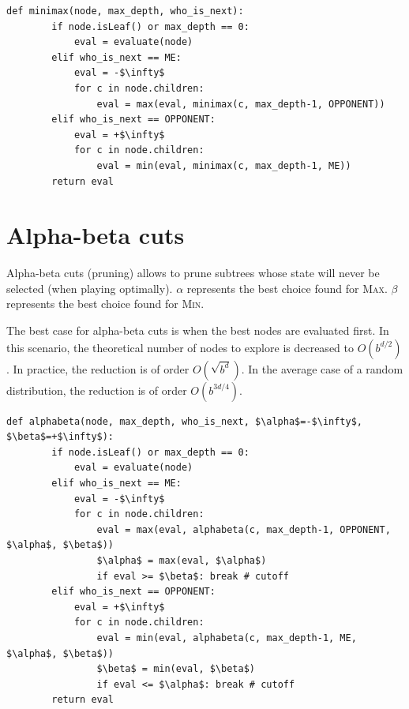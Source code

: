 \begin{algorithm}
\caption{Minimax}
\begin{lstlisting}[mathescape=true]
    def minimax(node, max_depth, who_is_next):
        if node.isLeaf() or max_depth == 0: 
            eval = evaluate(node)
        elif who_is_next == ME:
            eval = -$\infty$
            for c in node.children:
                eval = max(eval, minimax(c, max_depth-1, OPPONENT))
        elif who_is_next == OPPONENT:
            eval = +$\infty$
            for c in node.children:
                eval = min(eval, minimax(c, max_depth-1, ME))
        return eval
\end{lstlisting}
\end{algorithm}


\section{Alpha-beta cuts}
Alpha-beta cuts (pruning) allows to prune subtrees whose state will never be selected (when playing optimally).
$\alpha$ represents the best choice found for \textsc{Max}.
$\beta$ represents the best choice found for \textsc{Min}.

The best case for alpha-beta cuts is when the best nodes are evaluated first.
In this scenario, the theoretical number of nodes to explore is decreased to $O(b^{d/2})$.
In practice, the reduction is of order $O(\sqrt{b^d})$.
In the average case of a random distribution, the reduction is of order $O(b^{3d/4})$.

\begin{algorithm}
\caption{Minimax with alpha-beta cuts}
\begin{lstlisting}[mathescape=true]
    def alphabeta(node, max_depth, who_is_next, $\alpha$=-$\infty$, $\beta$=+$\infty$):
        if node.isLeaf() or max_depth == 0: 
            eval = evaluate(node)
        elif who_is_next == ME:
            eval = -$\infty$
            for c in node.children:
                eval = max(eval, alphabeta(c, max_depth-1, OPPONENT, $\alpha$, $\beta$))
                $\alpha$ = max(eval, $\alpha$)
                if eval >= $\beta$: break # cutoff
        elif who_is_next == OPPONENT:
            eval = +$\infty$
            for c in node.children:
                eval = min(eval, alphabeta(c, max_depth-1, ME, $\alpha$, $\beta$))
                $\beta$ = min(eval, $\beta$)
                if eval <= $\alpha$: break # cutoff
        return eval
\end{lstlisting}
\end{algorithm}

